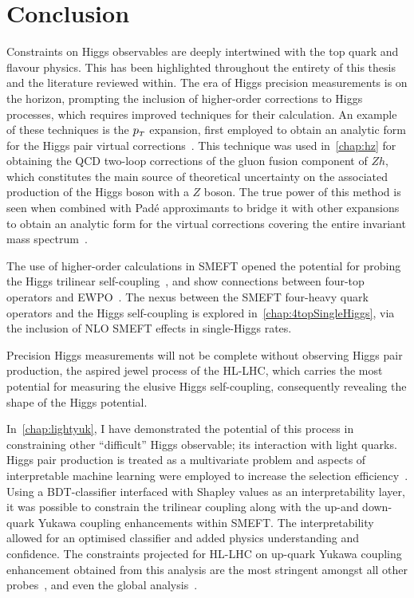 \chapter{Conclusion}
\par Constraints on Higgs observables are deeply intertwined with the top quark and flavour physics. This has been highlighted throughout the entirety of this thesis and the literature reviewed within.  The era of Higgs precision measurements is on the horizon, prompting the inclusion of higher-order corrections to Higgs processes, which requires improved techniques for their calculation. An example of these techniques is the $p_{\scriptscriptstyle T}$ expansion, first employed to obtain an analytic form for the Higgs pair virtual corrections~\cite{Bonciani:2018omm}. This technique was used in~\autoref{chap:hz} for obtaining the QCD two-loop corrections of the gluon fusion component of $Zh$, which constitutes the main source of theoretical uncertainty on the associated production of the Higgs boson with a $Z$ boson. The true power of this method is seen when combined with Pad\'e approximants to bridge it with other expansions to obtain an analytic form for the virtual corrections covering the entire invariant mass spectrum~\cite{Bellafronte:2022jmo}. 
\par  The use of higher-order calculations in SMEFT opened the potential for probing the Higgs trilinear self-coupling~\cite{Gorbahn:2016uoy, Degrassi:2016wml, Bizon:2016wgr, Maltoni:2017ims, Degrassi:2021uik}, and show connections between four-top operators and EWPO~\cite{Dawson:2022bxd}. The nexus between the SMEFT four-heavy quark operators and the Higgs self-coupling is explored in~\autoref{chap:4topSingleHiggs}, via the inclusion of NLO SMEFT effects in single-Higgs rates. 
\par  Precision Higgs measurements will not be complete without observing Higgs pair production, the aspired jewel process of the HL-LHC, which carries the most potential for measuring the elusive Higgs self-coupling,  consequently revealing the shape of the Higgs potential.
\par  In~\autoref{chap:lightyuk}, I have demonstrated the potential of this process in constraining other ``difficult'' Higgs observable; its interaction with light quarks. Higgs pair production is treated as a multivariate problem and aspects of interpretable machine learning were employed to increase the selection efficiency~\cite{Grojean:2020ech}. Using a BDT-classifier interfaced with Shapley values as an interpretability layer, it was possible to constrain the trilinear coupling along with the up-and down-quark Yukawa coupling enhancements within SMEFT. The interpretability allowed for an optimised classifier and added physics understanding and confidence. The constraints projected for HL-LHC on up-quark Yukawa coupling enhancement obtained from this analysis are the most stringent amongst all other probes~\cite{Soreq:2016rae,Falkowski:2020znk,Aguilar-Saavedra:2020rgo,Yu:2017vul}, and even the global analysis~\cite{deBlas:2019rxi}.  
